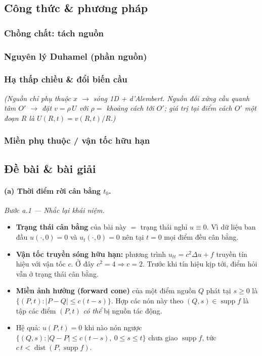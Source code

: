 \subsection*{Công thức \& phương pháp}

\subsubsection*{Chồng chất: tách nguồn}


\subsubsection*{Nguyên lý Duhamel (phần nguồn)}


\subsubsection*{Hạ thấp chiều \& đổi biến cầu}

\emph{(Nguồn chỉ phụ thuộc $x$ $\to$ sóng 1D + d'Alembert. Nguồn đối xứng cầu quanh tâm $O'$ $\to$ đặt $v=\rho\,U$ với $\rho=$ khoảng cách tới $O'$; giá trị tại điểm cách $O'$ một đoạn $R$ là $U(R,t)=v(R,t)/R$.)}

\subsubsection*{Miền phụ thuộc / vận tốc hữu hạn}


\subsection*{Đề bài \& bài giải}

\paragraph{(a) Thời điểm rời cân bằng $t_0$.}\leavevmode

\emph{Bước a.1 --- Nhắc lại khái niệm.}
\begin{itemize}
\item \textbf{Trạng thái cân bằng} của bài này $=$ trạng thái nghỉ $u\equiv0$. Vì dữ liệu ban đầu $u(\cdot,0)=0$ và $u_t(\cdot,0)=0$ nên tại $t=0$ mọi điểm đều cân bằng.
\item \textbf{Vận tốc truyền sóng hữu hạn:} phương trình $u_{tt}=c^2\Delta u+f$ truyền tín hiệu với vận tốc $c$. Ở đây $c^2=4\Rightarrow c=2$. Trước khi tín hiệu kịp tới, điểm hỏi vẫn ở trạng thái cân bằng.
\item \textbf{Miền ảnh hưởng (forward cone)} của một điểm nguồn $Q$ phát tại $s\ge0$ là $\{(P,t):|P-Q|\le c(t-s)\}$. Hợp các nón này theo $(Q,s)\in\operatorname{supp} f$ là tập các điểm $(P,t)$ \emph{có thể} bị nguồn tác động.
\item Hệ quả: $u(P,t)=0$ khi nào nón ngược $\{(Q,s):|Q-P|\le c(t-s),\ 0\le s\le t\}$ chưa giao $\operatorname{supp} f$, tức $c\,t<\operatorname{dist}(P,\operatorname{supp} f)$.
\end{itemize}

